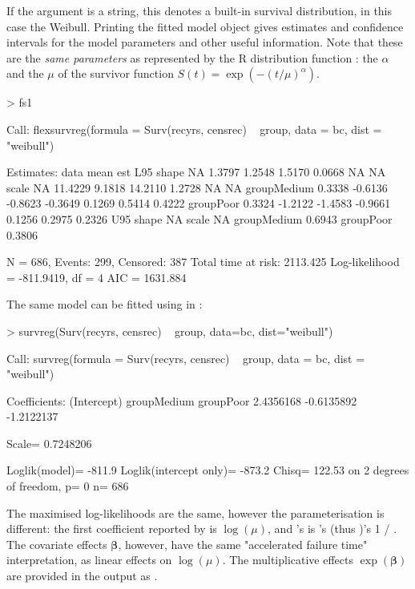 \documentclass[nojss,nofooter]{jss}
\begin{document}
If the argument  is a string, this denotes a built-in
survival distribution, in this case the Weibull.   
Printing the fitted model object gives estimates and confidence
intervals for the model parameters and other useful information.  Note
that these are the \emph{same parameters} as represented by
the R distribution function
: the  $\alpha$ and the  $\mu$ of the survivor function
$S(t) = \exp(-(t/\mu)^\alpha)$.  
\begin{Schunk}
\begin{Sinput}
> fs1
\end{Sinput}
\begin{Soutput}
Call:
flexsurvreg(formula = Surv(recyrs, censrec) ~ group, data = bc,     dist = "weibull")

Estimates: 
             data mean  est      L95%     U95%     se       exp(est)  L95%   
shape             NA     1.3797   1.2548   1.5170   0.0668       NA        NA
scale             NA    11.4229   9.1818  14.2110   1.2728       NA        NA
groupMedium   0.3338    -0.6136  -0.8623  -0.3649   0.1269   0.5414    0.4222
groupPoor     0.3324    -1.2122  -1.4583  -0.9661   0.1256   0.2975    0.2326
             U95%   
shape             NA
scale             NA
groupMedium   0.6943
groupPoor     0.3806

N = 686,  Events: 299,  Censored: 387
Total time at risk: 2113.425
Log-likelihood = -811.9419, df = 4
AIC = 1631.884
\end{Soutput}
\end{Schunk}
The same model can be fitted using  in 
:
\begin{Schunk}
\begin{Sinput}
> survreg(Surv(recyrs, censrec) ~ group, data=bc, dist="weibull")
\end{Sinput}
\begin{Soutput}
Call:
survreg(formula = Surv(recyrs, censrec) ~ group, data = bc, dist = "weibull")

Coefficients:
(Intercept) groupMedium   groupPoor 
  2.4356168  -0.6135892  -1.2122137 

Scale= 0.7248206 

Loglik(model)= -811.9   Loglik(intercept only)= -873.2
	Chisq= 122.53 on 2 degrees of freedom, p= 0 
n= 686 
\end{Soutput}
\end{Schunk}
The maximised log-likelihoods are the same, however the
parameterisation is different: the first coefficient
 reported by  is $\log(\mu)$, and
's  is 's (thus
)'s 1 / . The covariate effects $\bm{\beta}$,
however, have the same "accelerated failure time" interpretation, as
linear effects on $\log(\mu)$.  The multiplicative effects $\exp(\bm{\beta})$
are provided in the output as .
\end{document}
